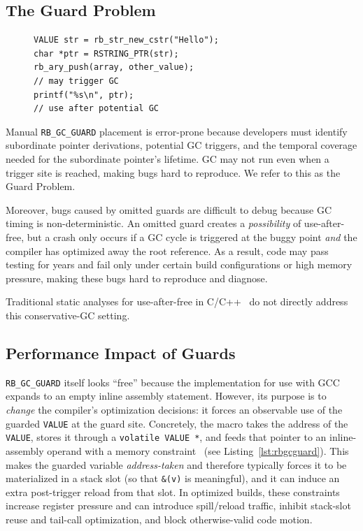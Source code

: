 \subsection{The Guard Problem}\label{sec:guard_problem}

\begin{figure}[tb]
\begin{lstlisting}[caption={The Guard Problem},label={lst:guard_problem}]
VALUE str = rb_str_new_cstr("Hello");
char *ptr = RSTRING_PTR(str);
rb_ary_push(array, other_value);
// may trigger GC
printf("%s\n", ptr);
// use after potential GC
\end{lstlisting}
\end{figure}

Manual \texttt{RB\_GC\_GUARD} placement is error-prone because developers must identify subordinate pointer derivations, potential GC triggers, and the temporal coverage needed for the subordinate pointer's lifetime.  GC may not run even when a trigger site is reached, making bugs hard to reproduce. We refer to this as the Guard Problem.

Moreover, bugs caused by omitted guards are difficult to debug because GC timing is non-deterministic. An omitted guard creates a \emph{possibility} of use-after-free, but a crash only occurs if a GC cycle is triggered at the buggy point \emph{and} the compiler has optimized away the root reference. As a result, code may pass testing for years and fail only under certain build configurations or high memory pressure, making these bugs hard to reproduce and diagnose.

Traditional static analyses for use-after-free in C/C++~\cite{static_analysis_use_after_free_cpp,spatio_temporal_context_reduction,static_analysis_dangling_pointer} do not directly address this conservative-GC setting.

\subsection{Performance Impact of Guards}\label{sec:Benchmark}

\texttt{RB\_GC\_GUARD} itself looks ``free'' because the implementation for use with GCC expands to an empty inline assembly statement.  However, its purpose is to \emph{change} the compiler's optimization decisions: it forces an observable use of the guarded \texttt{VALUE} at the guard site. Concretely, the macro takes the address of the \texttt{VALUE}, stores it through a \texttt{volatile VALUE *}, and feeds that pointer to an inline-assembly operand with a memory constraint~\cite{ruby_capi_rb_gc_guard} (see Listing~\ref{lst:rbgcguard}). This makes the guarded variable \emph{address-taken} and therefore typically forces it to be materialized in a stack slot (so that \texttt{\&(v)} is meaningful), and it can induce an extra post-trigger reload from that slot. In optimized builds, these constraints increase register pressure and can introduce spill/reload traffic, inhibit stack-slot reuse and tail-call optimization, and block otherwise-valid code motion.

